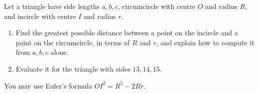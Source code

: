 Let a triangle have side lengths $a,b,c$, circumcircle with centre $O$ and radius $R$, and incircle with centre $I$ and radius $r$.
\begin{enumerate}
\item[(a)] Find the greatest possible distance between a point on the incircle and a point on the circumcircle, in terms of $R$ and $r$, and explain how to compute it from $a,b,c$ alone.
\item[(b)] Evaluate it for the triangle with sides $13,14,15$.
\end{enumerate}
You may use Euler's formula $OI^2=R^2-2Rr$.
